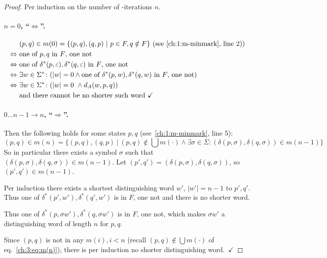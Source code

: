 \begin{proof}
	Per induction on the number of \CompDist-iterations $n$.
	
	\paragraph*{$n = 0$, ``$\Leftrightarrow$''.}
	\begin{align*}
		&(p,q) \in m(0) = \{ (p,q), (q,p)\ |\ p \in F, q \notin F \}\hfill\text{ (see~\ref{ch:1:m-minmark}, line 2))}\\
		\Leftrightarrow\ &\text{one of $p,q$ in $F$, one not}\\
		\Leftrightarrow\ &\text{one of $\delta^*(p, \varepsilon),\delta^*(q, \varepsilon)$ in $F$, one not}\\
		\Leftrightarrow\ &\exists w\in\Sigma^*\colon (|w|=0\land\text{one of $\delta^*(p, w),\delta^*(q, w)$ in $F$, one not})\\
		\Leftrightarrow\ &\exists w\in\Sigma^*\colon (|w| = 0\ \land d_A(w, p, q))\\
		&\text{and there cannot be no shorter such word }\checkmark
	\end{align*}
	
	\paragraph*{$0\ldots n-1 \rightarrow n$, ``$\Rightarrow$''.} 
	Then the following holds for some states $p,q$ (see~\ref{ch:1:m-minmark}, line 5):
	\begin{equation}\label{ch:3:eq:m(n)}
		(p,q) \in m(n) = \{ (p,q), (q,p)\ |\ (p,q) \notin \bigcup{m(\cdot)} \land \exists \sigma \in \Sigma \colon (\delta(p,\sigma), \delta(q,\sigma)) \in m(n-1) \}
	\end{equation}
	So in particular there exists a symbol $\sigma$ such that $(\delta(p,\sigma),\delta(q,\sigma)) \in m(n-1)$. Let $(p',q')=(\delta(p,\sigma),\delta(q,\sigma))$, so $(p',q')\in m(n-1)$.
	
	Per induction there exists a shortest distinguishing word $w'$, $|w'|=n-1$ to $p',q'$. Thus one of $\delta^*(p', w'),\delta^*(q', w')$ is in $F$, one not and there is no shorter word.
	
	Thus one of $\delta^*(p, \sigma w'),\delta^*(q, \sigma w')$ is in $F$, one not, which makes $\sigma w'$ a distinguishing word of length $n$ for $p,q$.
	
	Since $(p,q)$ is not in any $m(i), i<n$ (recall $(p,q) \notin \bigcup{m(\cdot)}$ of eq.~\ref{ch:3:eq:m(n)}), there is per induction no shorter distinguishing word.\ $\checkmark$ 
	

\end{proof}
